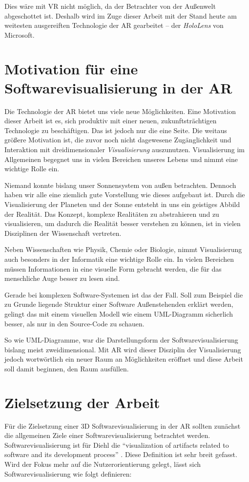 Dies wäre mit VR nicht möglich, da der Betrachter von der Außenwelt abgeschottet ist. Deshalb wird im Zuge dieser Arbeit mit der Stand heute am weitesten ausgereiften Technologie der AR gearbeitet -- der \emph{HoloLens} von Microsoft.

\section{Motivation für eine Softwarevisualisierung in der AR}
Die Technologie der AR bietet uns viele neue Möglichkeiten. Eine Motivation dieser Arbeit ist es, sich produktiv mit einer neuen, zukunftsträchtigen Technologie zu beschäftigen. Das ist jedoch nur die eine Seite. Die weitaus größere Motivation ist, die zuvor noch nicht dagewesene Zugänglichkeit und Interaktion mit dreidimensionaler \emph{Visualisierung} auszunutzen. Visualisierung im Allgemeinen begegnet uns in vielen Bereichen unseres Lebens und nimmt eine wichtige Rolle ein.

Niemand konnte bislang unser Sonnensystem von außen betrachten. Dennoch haben wir alle eine ziemlich gute Vorstellung wie dieses aufgebaut ist. Durch die Visualisierung der Planeten und der Sonne entsteht in uns ein geistiges Abbild der Realität. Das Konzept, komplexe Realitäten zu abstrahieren und zu visualisieren, um dadurch die Realität besser verstehen zu können, ist in vielen Disziplinen der Wissenschaft vertreten.

Neben Wissenschaften wie Physik, Chemie oder Biologie, nimmt Visualisierung auch besonders in der Informatik eine wichtige Rolle ein. In vielen Bereichen müssen Informationen in eine visuelle Form gebracht werden, die für das menschliche Auge besser zu lesen sind.

Gerade bei komplexen Software-Systemen ist das der Fall. Soll zum Beispiel die zu Grunde liegende Struktur einer Software Außenstehenden erklärt werden, gelingt das mit einem visuellen Modell wie einem UML-Diagramm sicherlich besser, als nur in den Source-Code zu schauen.

So wie UML-Diagramme, war die Darstellungsform der Softwarevisualisierung bislang meist zweidimensional. Mit AR wird dieser Disziplin der Visualisierung jedoch wortwörtlich ein neuer Raum an Möglichkeiten eröffnet und diese Arbeit soll damit beginnen, den Raum ausfüllen.

\section{Zielsetzung der Arbeit}
Für die Zielsetzung einer 3D Softwarevisualisierung in der AR sollten zunächst die allgemeinen Ziele einer Softwarevisualisierung betrachtet werden. Softwarevisualisierung ist für Diehl die "`visualization of artifacts related to software and its development process"' \cite{diehl2007software}. Diese Definition ist sehr breit gefasst. Wird der Fokus mehr auf die Nutzerorientierung gelegt, lässt sich Softwarevisualisierung wie folgt definieren:

